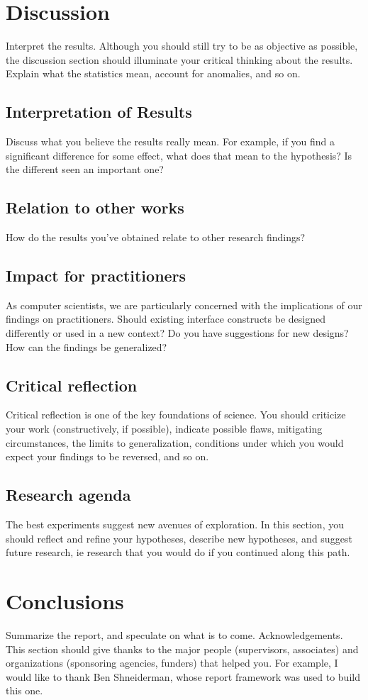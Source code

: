 \section{Discussion}
Interpret the results. Although you should still try to be as objective as possible, the discussion section should illuminate your critical thinking about the results. Explain what the statistics mean, account for anomalies, and so on.
\subsection{Interpretation of Results}
Discuss what you believe the results really mean. For example, if you find a significant difference for some effect, what does that mean to the hypothesis? Is the different seen an important one?
\subsection{Relation to other works}
How do the results you’ve obtained relate to other research findings?
\subsection{Impact for practitioners}
As computer scientists, we are particularly concerned with the implications of our findings on practitioners. Should existing interface constructs be designed differently or used in a new context? Do you have suggestions for new designs? How can the findings be generalized?
\subsection{Critical reflection}
Critical reflection is one of the key foundations of science. You should criticize your work (constructively, if possible), indicate possible flaws, mitigating circumstances, the limits to generalization, conditions under which you would expect your findings to be reversed, and so on.
\subsection{Research agenda}
The best experiments suggest new avenues of exploration. In this section, you should reflect and refine your hypotheses, describe new hypotheses, and suggest future research, ie research that you would do if you continued along this path.
\section{Conclusions}
Summarize the report, and speculate on what is to come.
Acknowledgements. This section should give thanks to the major people (supervisors, associates) and organizations (sponsoring agencies, funders) that helped you. For example, I would like to thank Ben Shneiderman, whose report framework was used to build this one.

